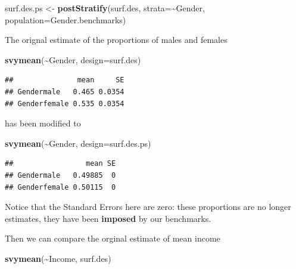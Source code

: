 \documentclass[
]{book}
\newenvironment{Shaded}{\begin{snugshade}}{\end{snugshade}}
\newcommand{\AttributeTok}[1]{\textcolor[rgb]{0.13,0.29,0.53}{#1}}
\newcommand{\FunctionTok}[1]{\textcolor[rgb]{0.13,0.29,0.53}{\textbf{#1}}}
\newcommand{\NormalTok}[1]{#1}
\newcommand{\OtherTok}[1]{\textcolor[rgb]{0.56,0.35,0.01}{#1}}
\newcommand{\SpecialCharTok}[1]{\textcolor[rgb]{0.81,0.36,0.00}{\textbf{#1}}}
\begin{document}
\begin{Shaded}
\begin{Highlighting}[]
\NormalTok{surf.des.ps }\OtherTok{\textless{}{-}} \FunctionTok{postStratify}\NormalTok{(surf.des, }\AttributeTok{strata=}\SpecialCharTok{\textasciitilde{}}\NormalTok{Gender, }
                            \AttributeTok{population=}\NormalTok{Gender.benchmarks)}
\end{Highlighting}
\end{Shaded}

The orignal estimate of the proportions of males and females

\begin{Shaded}
\begin{Highlighting}[]
\FunctionTok{svymean}\NormalTok{(}\SpecialCharTok{\textasciitilde{}}\NormalTok{Gender, }\AttributeTok{design=}\NormalTok{surf.des)}
\end{Highlighting}
\end{Shaded}

\begin{verbatim}
##               mean     SE
## Gendermale   0.465 0.0354
## Genderfemale 0.535 0.0354
\end{verbatim}

has been modified to

\begin{Shaded}
\begin{Highlighting}[]
\FunctionTok{svymean}\NormalTok{(}\SpecialCharTok{\textasciitilde{}}\NormalTok{Gender, }\AttributeTok{design=}\NormalTok{surf.des.ps)}
\end{Highlighting}
\end{Shaded}

\begin{verbatim}
##                 mean SE
## Gendermale   0.49885  0
## Genderfemale 0.50115  0
\end{verbatim}

Notice that the Standard Errors here are zero: these proportions are no longer
estimates, they have been \textbf{imposed} by our benchmarks.

Then we can compare the orginal estimate of mean income

\begin{Shaded}
\begin{Highlighting}[]
\FunctionTok{svymean}\NormalTok{(}\SpecialCharTok{\textasciitilde{}}\NormalTok{Income, surf.des)}
\end{Highlighting}
\end{Shaded}
\end{document}

